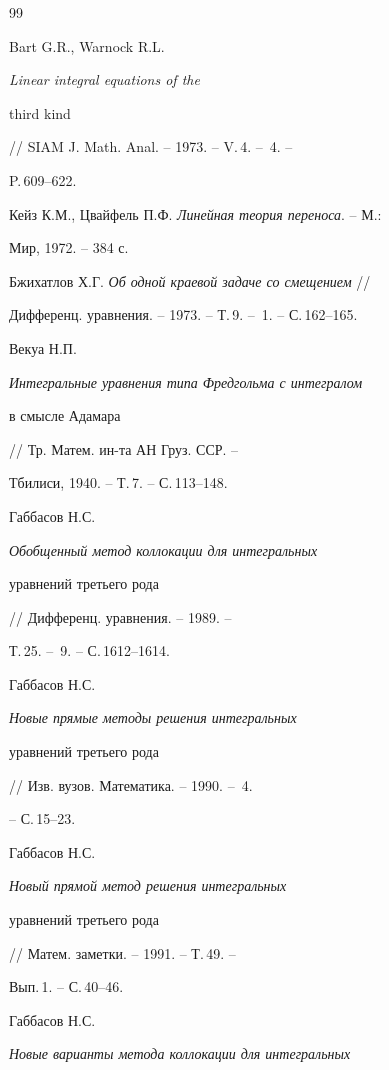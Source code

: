 \begin{thebibliography}{99} 


 




Bart G.R., Warnock R.L. {\em Linear integral equations of the 


third kind} // SIAM J. Math. Anal. -- 1973. -- V.\,4. -- \No\,4. -- 


P.\,609--622. 






Кейз К.М., Цвайфель П.Ф. {\em Линейная теория переноса}. -- М.: 


Мир, 1972. -- 384 с. 




Бжихатлов Х.Г. {\em Об одной краевой задаче со смещением} // 


Дифференц. уравнения. -- 1973. -- Т.\,9. -- \No\,1. -- С.\,162--165. 




Векуа Н.П. {\em Интегральные уравнения типа Фредгольма с интегралом 


в смысле Адамара} // Тр. Матем. ин-та АН Груз. ССР. -- 


Тбилиси, 1940. -- Т.\,7. -- С.\,113--148. 




Габбасов Н.С. {\em Обобщенный метод коллокации для интегральных 


уравнений третьего рода} // Дифференц. уравнения. -- 1989. -- 


Т.\,25. -- \No\,9. -- С.\,1612--1614. 




Габбасов Н.С. {\em Новые прямые методы решения интегральных 


уравнений третьего рода} // Изв. вузов. Математика. -- 1990. -- \No\,4. 


-- С.\,15--23. 




Габбасов Н.С. {\em Новый прямой метод решения интегральных 


уравнений третьего рода} // Матем. заметки. -- 1991. -- Т.\,49. -- 


Вып.\,1. -- С.\,40--46. 




Габбасов Н.С. {\em Новые варианты метода коллокации для интегральных 


}
\end{thebibliography}
